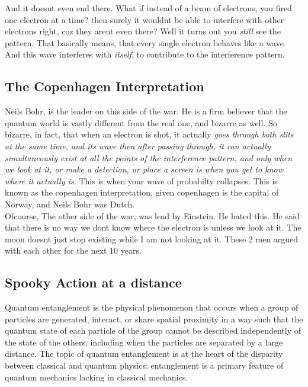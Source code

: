 \documentclass[11pt]{article}
\begin{document}
And it doesnt even end there. What if instead of a beam of electrons, you fired one electron at a time? then surely it wouldnt be able to interfere with other electrons right, coz they arent even there? Well it turns out you \textit{still} see the pattern. That basically means, that every single electron behaves like a wave. And this wave interferes with \textit{itself}, to contribute to the interference pattern. \\

\subsection{The Copenhagen Interpretation}
Neils Bohr, is the leader on this side of the war. He is a firm believer that the quantum world is vastly different from the real one, and bizarre as well. So bizarre, in fact, that when an electron is shot, it actually \textit{goes through both slits at the same time, and its wave then after passing through, it can actually simultaneously exist at all the points of the interference pattern, and only when we look at it, or make a detection, or place a screen is when you get to know where it actually is.} This is when your wave of probabilty collapses. This is known as the copenhagen interpretation, given copenhagen is the capital of Norway, and Neils Bohr was Dutch.  \\

Ofcourse, The other side of the war, was lead by Einstein. He hated this. He said that there is no way we dont know where the electron is unless we look at it. The moon doesnt just stop existing while I am not looking at it. These 2 men argued with each other for the next 10 years. \\

\subsection{Spooky Action at a distance}

Quantum entanglement is the physical phenomenon that occurs when a group of particles are generated, interact, or share spatial proximity in a way such that the quantum state of each particle of the group cannot be described independently of the state of the others, including when the particles are separated by a large distance. The topic of quantum entanglement is at the heart of the disparity between classical and quantum physics: entanglement is a primary feature of quantum mechanics lacking in classical mechanics.\\
\end{document}
